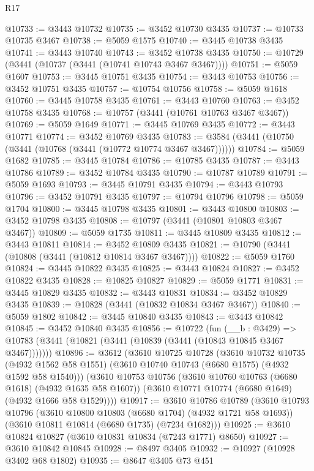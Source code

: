 \begin{lexlean}{R17}
\begin{coremodule}
@10733 := @3443 @10732
@10735 := @3452 @10730 @3435
@10737 := @10733 @10735 @3467
@10738 := @5059 @1575
@10740 := @3445 @10738 @3435
@10741 := @3443 @10740
@10743 := @3452 @10738 @3435
@10750 := @10729 (@3441 (@10737 (@3441 (@10741 @10743 @3467 @3467))))
@10751 := @5059 @1607
@10753 := @3445 @10751 @3435
@10754 := @3443 @10753
@10756 := @3452 @10751 @3435
@10757 := @10754 @10756
@10758 := @5059 @1618
@10760 := @3445 @10758 @3435
@10761 := @3443 @10760
@10763 := @3452 @10758 @3435
@10768 := @10757 (@3441 (@10761 @10763 @3467 @3467))
@10769 := @5059 @1649
@10771 := @3445 @10769 @3435
@10772 := @3443 @10771
@10774 := @3452 @10769 @3435
@10783 := @3584 (@3441 (@10750 (@3441 (@10768 (@3441 (@10772 @10774 @3467 @3467))))))
@10784 := @5059 @1682
@10785 := @3445 @10784
@10786 := @10785 @3435
@10787 := @3443 @10786
@10789 := @3452 @10784 @3435
@10790 := @10787 @10789
@10791 := @5059 @1693
@10793 := @3445 @10791 @3435
@10794 := @3443 @10793
@10796 := @3452 @10791 @3435
@10797 := @10794 @10796
@10798 := @5059 @1704
@10800 := @3445 @10798 @3435
@10801 := @3443 @10800
@10803 := @3452 @10798 @3435
@10808 := @10797 (@3441 (@10801 @10803 @3467 @3467))
@10809 := @5059 @1735
@10811 := @3445 @10809 @3435
@10812 := @3443 @10811
@10814 := @3452 @10809 @3435
@10821 := @10790 (@3441 (@10808 (@3441 (@10812 @10814 @3467 @3467))))
@10822 := @5059 @1760
@10824 := @3445 @10822 @3435
@10825 := @3443 @10824
@10827 := @3452 @10822 @3435
@10828 := @10825 @10827
@10829 := @5059 @1771
@10831 := @3445 @10829 @3435
@10832 := @3443 @10831
@10834 := @3452 @10829 @3435
@10839 := @10828 (@3441 (@10832 @10834 @3467 @3467))
@10840 := @5059 @1802
@10842 := @3445 @10840 @3435
@10843 := @3443 @10842
@10845 := @3452 @10840 @3435
@10856 := @10722
    (fun (__b : @3429) =>
    @10783 (@3441 (@10821 (@3441 (@10839 (@3441 (@10843 @10845 @3467 @3467)))))))
@10896 := @3612
    (@3610
      @10725
      @10728
      (@3610
        @10732
        @10735
        (@4932 @1562 @58 @1551)
        (@3610 @10740 @10743 (@6680 @1575) (@4932 @1592 @58 @1540)))
      (@3610
        @10753
        @10756
        (@3610 @10760 @10763 (@6680 @1618) (@4932 @1635 @58 @1607))
        (@3610 @10771 @10774 (@6680 @1649) (@4932 @1666 @58 @1529))))
@10917 := @3610
    @10786
    @10789
    (@3610
      @10793
      @10796
      (@3610 @10800 @10803 (@6680 @1704) (@4932 @1721 @58 @1693))
      (@3610 @10811 @10814 (@6680 @1735) (@7234 @1682)))
@10925 := @3610 @10824 @10827 (@3610 @10831 @10834 (@7243 @1771) @8650)
@10927 := @3610 @10842 @10845
@10928 := @8497 @3405
@10932 := @10927 (@10928 @3402 @68 @1802)
@10935 := @8647 @3405 @73 @451

\end{coremodule}
\end{lexlean}
